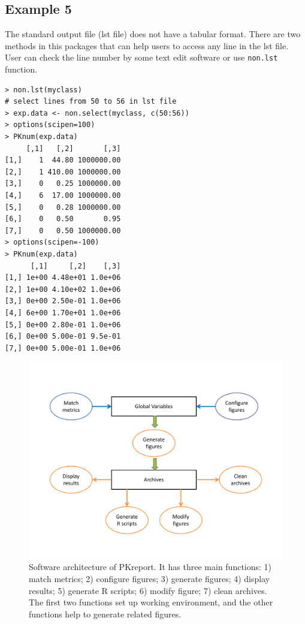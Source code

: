 \documentclass[a4paper]{article}
\begin{document}
\subsection{Example 5}
The standard output file (lst file) does not have a tabular format. There are two methods in this packages that can help users to access any line in the lst file. User can check the line number by some text edit software or use \texttt{non.lst} function.
\begin{verbatim}
> non.lst(myclass)
# select lines from 50 to 56 in lst file
> exp.data <- non.select(myclass, c(50:56))
> options(scipen=100)
> PKnum(exp.data)
     [,1]   [,2]       [,3]
[1,]    1  44.80 1000000.00
[2,]    1 410.00 1000000.00
[3,]    0   0.25 1000000.00
[4,]    6  17.00 1000000.00
[5,]    0   0.28 1000000.00
[6,]    0   0.50       0.95
[7,]    0   0.50 1000000.00
> options(scipen=-100)
> PKnum(exp.data)
      [,1]     [,2]    [,3]
[1,] 1e+00 4.48e+01 1.0e+06
[2,] 1e+00 4.10e+02 1.0e+06
[3,] 0e+00 2.50e-01 1.0e+06
[4,] 6e+00 1.70e+01 1.0e+06
[5,] 0e+00 2.80e-01 1.0e+06
[6,] 0e+00 5.00e-01 9.5e-01
[7,] 0e+00 5.00e-01 1.0e+06
\end{verbatim}



\begin{figure}[h!tb] \centering
\includegraphics[scale=0.5]{c2_s1_1.pdf}
\caption{Software architecture of PKreport. It has three main functions: 1) match metrics; 2) configure figures; 3) generate figures; 4) display results; 5) generate R scripts; 6) modify figure; 7) clean archives. The first two functions set up working environment, and the other functions help to generate related figures.}
\label{c2_s1_1}
\end{figure}
\end{document}
